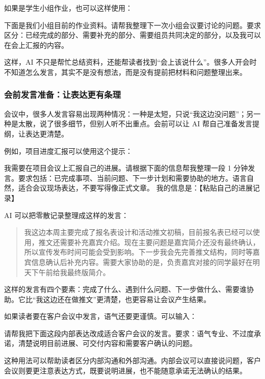 如果是学生小组作业，也可以这样使用：

\begin{tcolorbox}[promptbox]
下面是我们小组目前的作业资料。请帮我整理下一次小组会议要讨论的问题。要求区分：已经完成的部分、需要补充的部分、需要组员共同决定的部分，以及我可以在会上汇报的内容。
\end{tcolorbox}

这样，AI 不只是帮忙总结资料，还能帮读者找到“会上该说什么”。很多人开会时不知道怎么发言，其实不是没有想法，而是没有提前把材料和问题整理出来。

\subsubsection*{会前发言准备：让表达更有条理}

会议中，很多人发言容易出现两种情况：一种是太短，只说“我这边没问题”；另一种是太散，说了很多细节，但别人听不出重点。会前可以让 AI 帮自己准备发言提纲，让表达更清楚。

例如，项目进度汇报可以使用这个提示：

\begin{tcolorbox}[promptbox]
我需要在项目会议上汇报自己的进展。请根据下面的信息帮我整理一段 1 分钟发言。要求包括：已完成事项、当前问题、下一步计划和需要协助的地方。语言自然，适合会议现场表达，不要写得像正式文章。
我的信息是：【粘贴自己的进展记录】
\end{tcolorbox}

AI 可以把零散记录整理成这样的发言：

\begin{quote}
我这边本周主要完成了报名表设计和活动推文初稿，目前报名表已经可以使用，推文还需要补充嘉宾介绍。现在主要问题是嘉宾简介还没有最终确认，所以宣传发布时间可能会受到影响。下一步我会先完善推文结构，同时等嘉宾信息确认后补充内容。需要大家协助的是，负责嘉宾对接的同学最好在明天下午前给我最终版简介。
\end{quote}

这样的发言有四个要素：完成了什么、遇到什么问题、下一步做什么、需要谁协助。它比“我这边还在做推文”更清楚，也更容易让会议产生结果。

如果读者要在客户会议中发言，语气还要更谨慎。可以输入：

\begin{tcolorbox}[promptbox]
请帮我把下面这段内部表达改成适合客户会议的发言。要求：语气专业、不过度承诺，清楚说明目前进展、可交付内容和需要客户确认的问题。
\end{tcolorbox}

这种用法可以帮助读者区分内部沟通和外部沟通。内部会议可以直接说问题，客户会议则要更注意表达方式，既要说明进展，也不能随意承诺无法确认的结果。

